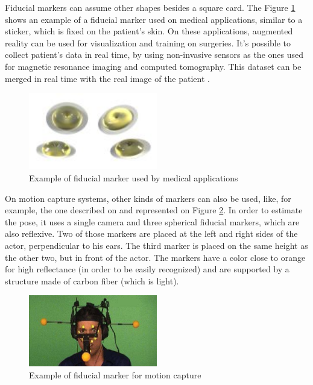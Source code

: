 \documentclass[msc, a4paper, classic, en]{ufbathesis}
\begin{document}
Fiducial markers can assume other shapes besides a square card. The Figure \ref{fig:sticker} shows an example of a fiducial marker used on medical applications, similar to a sticker, which is fixed on the patient's skin. On these applications, augmented reality can be used for visualization and training on surgeries. It's possible to collect patient's data in real time, by using non-invasive sensors as the ones used for magnetic resonance imaging and computed tomography. This dataset can be merged in real time with the real image of the patient \cite{azuma}.

\begin{figure}
\centering
\includegraphics[width=0.5\textwidth]{images/sticker.png}
\caption{Example of fiducial marker used by medical applications \cite{azuma}}
\label{fig:sticker}
\end{figure}

On motion capture systems, other kinds of markers can also be used, like, for example, the one described on \cite{4526681} and represented on Figure \ref{fig:helmet}. In order to estimate the pose, it uses a single camera and three spherical fiducial markers, which are also reflexive. Two of those markers are placed at the left and right sides of the actor, perpendicular to his ears. The third marker is placed on the same height as the other two, but in front of the actor. The markers have a color close to orange for high reflectance (in order to be easily recognized) and are supported by a structure made of carbon fiber (which is light).

\begin{figure}
\centering
\includegraphics[width=0.5\textwidth]{images/helmet.png}
\caption{Example of fiducial marker for motion capture \cite{4526681}}
\label{fig:helmet}
\end{figure}
\end{document}
